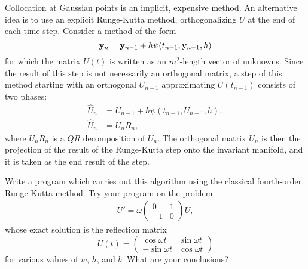 \begin{problem}[A\&P 4.17]
  Collocation at Gaussian points is an implicit, expensive method. An
alternative idea is to use an explicit Runge-Kutta method, orthogonalizing $U$ at the end of each time step. Consider a method of the form
  \[
    \mathbf{y}_n = \mathbf{y}_{n-1} + h \mathbf{\psi}(t_{n-1}, \mathbf{y}_{n-1}, h)
  \]
  for which the matrix $U(t)$ is written as an $m^2$-length vector of unknowns. Since the result of this step is not necessarily an orthogonal matrix, a step of this method starting with an orthogonal $U_{n-1}$ approximating $U(t_{n-1})$ consists of two phases:
  \begin{align*}
    \hat{U}_n &= U_{n-1} + h \psi(t_{n-1}, U_{n-1}, h), \\
    \hat{U}_n &= U_n R_n,
  \end{align*}
  where $U_n R_n$ is a $QR$ decomposition of $U_n$. The orthogonal matrix $U_n$ is then the projection of the result of the Runge-Kutta step onto the invariant manifold, and it is taken as the end result of the step.
  
  Write a program which carries out this algorithm using the classical fourth-order Runge-Kutta method. Try your program on the problem
  \begin{align*}
    U' = \omega
    \begin{pmatrix}
      0 & 1 \\
      -1 & 0
    \end{pmatrix}
    U,
  \end{align*}
  whose exact solution is the reflection matrix
  \[
    U(t) = 
    \begin{pmatrix}
      \cos \omega t & \sin \omega t \\
      -\sin \omega t & \cos \omega t
    \end{pmatrix}
  \]
  for various values of $w$, $h$, and $b$. What are your conclusions?
\end{problem}

\FloatBarrier

